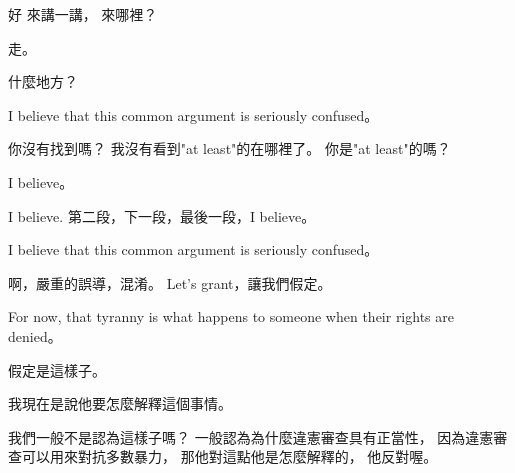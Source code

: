 \hypertarget{w06:cue:2965}{}好 來講一講，
\hypertarget{w06:cue:2966}{}來哪裡？

\hypertarget{w06:cue:2967}{}走。

\hypertarget{w06:cue:2968}{}什麼地方？

\hypertarget{w06:cue:2969}{}I believe that this common argument is seriously confused。

\hypertarget{w06:cue:2970}{}你沒有找到嗎？
\hypertarget{w06:cue:2971}{}我沒有看到"at least"的在哪裡了。
\hypertarget{w06:cue:2972}{}你是"at least"的嗎？

\hypertarget{w06:cue:2973}{}I believe。

\hypertarget{w06:cue:2974}{}I believe.
\hypertarget{w06:cue:2975}{}第二段，下一段，最後一段，I believe。

\hypertarget{w06:cue:2976}{}I believe that this common argument is seriously confused。

\hypertarget{w06:cue:2977}{}啊，嚴重的誤導，混淆。
\hypertarget{w06:cue:2978}{}Let's grant，讓我們假定。

\hypertarget{w06:cue:2979}{}For now, that tyranny is what happens to someone
\hypertarget{w06:cue:2980}{}when their rights are denied。

\hypertarget{w06:cue:2981}{}假定是這樣子。

\hypertarget{w06:cue:2982}{}我現在是說他要怎麼解釋這個事情。

\hypertarget{w06:cue:2983}{}我們一般不是認為這樣子嗎？
\hypertarget{w06:cue:2984}{}一般認為為什麼違憲審查具有正當性，
\hypertarget{w06:cue:2985}{}因為違憲審查可以用來對抗多數暴力，
\hypertarget{w06:cue:2986}{}那他對這點他是怎麼解釋的，
\hypertarget{w06:cue:2987}{}他反對喔。

